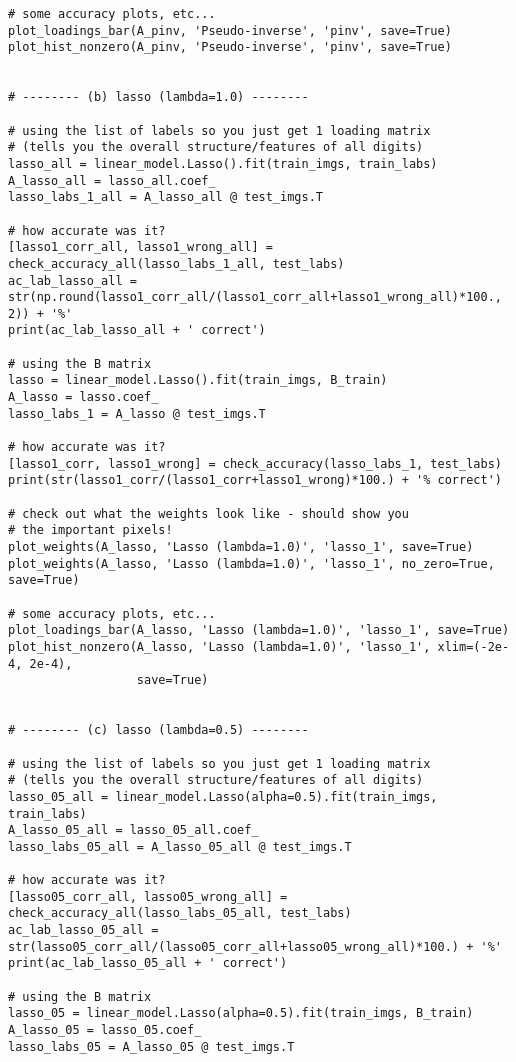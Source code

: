 \documentclass[10pt]{article}
\begin{document}
\begin{lstlisting}
# some accuracy plots, etc...
plot_loadings_bar(A_pinv, 'Pseudo-inverse', 'pinv', save=True)
plot_hist_nonzero(A_pinv, 'Pseudo-inverse', 'pinv', save=True)


# -------- (b) lasso (lambda=1.0) --------

# using the list of labels so you just get 1 loading matrix 
# (tells you the overall structure/features of all digits)
lasso_all = linear_model.Lasso().fit(train_imgs, train_labs)
A_lasso_all = lasso_all.coef_
lasso_labs_1_all = A_lasso_all @ test_imgs.T

# how accurate was it?
[lasso1_corr_all, lasso1_wrong_all] = check_accuracy_all(lasso_labs_1_all, test_labs)
ac_lab_lasso_all = str(np.round(lasso1_corr_all/(lasso1_corr_all+lasso1_wrong_all)*100., 2)) + '%'
print(ac_lab_lasso_all + ' correct')

# using the B matrix
lasso = linear_model.Lasso().fit(train_imgs, B_train)
A_lasso = lasso.coef_
lasso_labs_1 = A_lasso @ test_imgs.T

# how accurate was it?
[lasso1_corr, lasso1_wrong] = check_accuracy(lasso_labs_1, test_labs)
print(str(lasso1_corr/(lasso1_corr+lasso1_wrong)*100.) + '% correct')

# check out what the weights look like - should show you 
# the important pixels!
plot_weights(A_lasso, 'Lasso (lambda=1.0)', 'lasso_1', save=True)
plot_weights(A_lasso, 'Lasso (lambda=1.0)', 'lasso_1', no_zero=True, save=True)

# some accuracy plots, etc...
plot_loadings_bar(A_lasso, 'Lasso (lambda=1.0)', 'lasso_1', save=True)
plot_hist_nonzero(A_lasso, 'Lasso (lambda=1.0)', 'lasso_1', xlim=(-2e-4, 2e-4),
                  save=True)


# -------- (c) lasso (lambda=0.5) --------

# using the list of labels so you just get 1 loading matrix 
# (tells you the overall structure/features of all digits)
lasso_05_all = linear_model.Lasso(alpha=0.5).fit(train_imgs, train_labs)
A_lasso_05_all = lasso_05_all.coef_
lasso_labs_05_all = A_lasso_05_all @ test_imgs.T

# how accurate was it?
[lasso05_corr_all, lasso05_wrong_all] = check_accuracy_all(lasso_labs_05_all, test_labs)
ac_lab_lasso_05_all = str(lasso05_corr_all/(lasso05_corr_all+lasso05_wrong_all)*100.) + '%'
print(ac_lab_lasso_05_all + ' correct')

# using the B matrix
lasso_05 = linear_model.Lasso(alpha=0.5).fit(train_imgs, B_train)
A_lasso_05 = lasso_05.coef_
lasso_labs_05 = A_lasso_05 @ test_imgs.T


\end{lstlisting}
\end{document}
